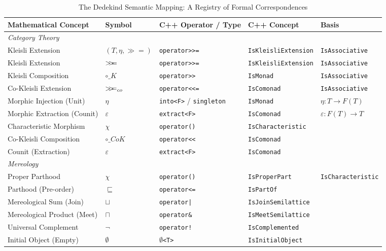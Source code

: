 \documentclass[11pt, a4paper]{report}
\newcommand{\bind}{\mathbin{>\!\!>\mkern-6.7mu=}}
\begin{document}
\begin{table}
\centering
\caption{The Dedekind Semantic Mapping: A Registry of Formal Correspondences}
\label{table:semantic_mapping}
\begin{small}
\begin{tabular}{@{}lllll@{}}
\toprule
\textbf{Mathematical Concept} & \textbf{Symbol} & \textbf{C++ Operator / Type} & \textbf{C++ Concept} & \textbf{Basis} \\ \midrule
\textit{Category Theory} & & & & \\
Kleisli Extension & $(T, \eta, \gg=)$ & \texttt{operator>>=} & \texttt{IsKleisliExtension} & \texttt{IsAssociative}\\
Kleisli Extension & $\bind$ & \texttt{operator>>=} & \texttt{IsKleisliExtension} & \texttt{IsAssociative}\\
Kleisli Composition & $\circ\_{K}$ & \texttt{operator>>} & \texttt{IsMonad} & \texttt{IsAssociative}\\
Co-Kleisli Extension & $\bind_{co}$ & \texttt{operator<<=} & \texttt{IsComonad} & \texttt{IsAssociative} \\
Morphic Injection (Unit) & $\eta$ & \texttt{into<F>} / \texttt{singleton} & \texttt{IsMonad} & $\eta: T \to F(T)$ \\
Morphic Extraction (Counit) & $\varepsilon$ & \texttt{extract<F>} & \texttt{IsComonad} & $\varepsilon: F(T) \to T$ \\
Characteristic Morphism & $\chi$ & \texttt{operator()} & \texttt{IsCharacteristic} & \\
Co-Kleisli Composition & $\circ\_{CoK}$ & \texttt{operator<<} & \texttt{IsComonad} & \\
Counit (Extraction) & $\varepsilon$ & \texttt{extract<F>} & \texttt{IsComonad} & \\ 
\midrule
\textit{Mereology} & & & & \\
Proper Parthood & $\chi$ & \texttt{operator()} & \texttt{IsProperPart} & \texttt{IsCharacteristic}\\
Parthood (Pre-order) & $\sqsubseteq$ & \texttt{operator<=} & \texttt{IsPartOf} & \\
Mereological Sum (Join) & $\sqcup$ & \texttt{operator|} & \texttt{IsJoinSemilattice} & \\
Mereological Product (Meet) & $\sqcap$ & \texttt{operator\&} & \texttt{IsMeetSemilattice}&  \\
Universal Complement & $\neg$ & \texttt{operator!} & \texttt{IsComplemented} & \\
Initial Object (Empty) & $\emptyset$ & \texttt{$\emptyset$<T>} & \texttt{IsInitialObject} & \\

\end{tabular}
\end{small}
\end{table}
\end{document}
